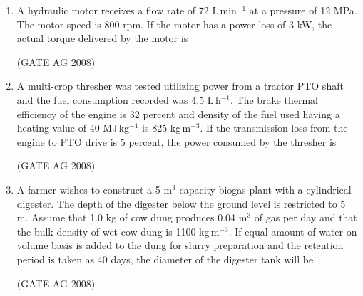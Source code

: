 \documentclass[journal,12pt,onecolumn]{IEEEtran}
\begin{document}
\begin{enumerate}
\medskip

\item 
 A hydraulic motor receives a flow rate of 72 L\,min$^{-1}$ at a pressure of 12 MPa. The motor speed is 800 rpm. If the motor has a power loss of 3 kW, the actual torque delivered by the motor is
\begin{enumerate}
\end{enumerate}
\hfill(GATE AG 2008)\\

\medskip

\item 
 A multi-crop thresher was tested utilizing power from a tractor PTO shaft and the fuel consumption recorded was 4.5 L\,h$^{-1}$. The brake thermal efficiency of the engine is 32 percent and density of the fuel used having a heating value of 40 MJ\,kg$^{-1}$ is 825 kg\,m$^{-3}$. If the transmission loss from the engine to PTO drive is 5 percent, the power consumed by the thresher is
\begin{enumerate}
\end{enumerate}
\hfill(GATE AG 2008)\\

\medskip

\item 
 A farmer wishes to construct a 5 m$^3$ capacity biogas plant with a cylindrical digester. The depth of the digester below the ground level is restricted to 5 m. Assume that 1.0 kg of cow dung produces 0.04 m$^3$ of gas per day and that the bulk density of wet cow dung is 1100 kg\,m$^{-3}$. If equal amount of water on volume basis is added to the dung for slurry preparation and the retention period is taken as 40 days, the diameter of the digester tank will be
\begin{enumerate}
\end{enumerate}
\hfill(GATE AG 2008)\\


\end{enumerate}
\end{document}
